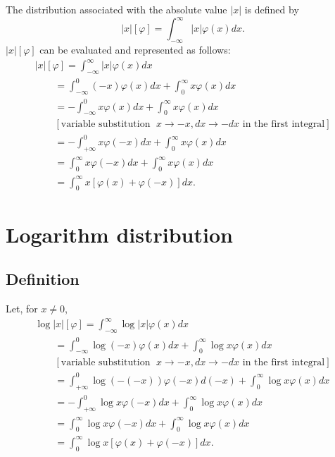 The distribution associated with the absolute value $\left|x\right|$ is defined by
 \begin{equation}
\left|x\right| \left[ \varphi \right] =
\int_{-\infty}^\infty  \left|x\right|  \varphi(x) dx.
 \end{equation}
$\left|x\right| \left[ \varphi \right]$
can be evaluated and represented as follows:
\begin{equation}
\begin{split}
\left|x\right| \left[ \varphi \right]
=
\int_{-\infty}^\infty  \left|x\right|  \varphi(x) dx
\\
\qquad
=
\int_{-\infty}^0 (-x)  \varphi(x) dx
+
\int_{0}^\infty   x   \varphi(x) dx
\\
\qquad
=
-\int_{-\infty}^0  x   \varphi(x) dx
+
\int_{0}^\infty   x   \varphi(x) dx
\\
\qquad
[\textrm{variable substitution }\; x\rightarrow -x, dx \rightarrow -dx \textrm{ in the first integral}]
\\
\qquad
=
-\int_{+\infty}^0  x   \varphi(-x) dx
+
\int_{0}^\infty   x   \varphi(x) dx
\\
\qquad
=
\int_0^{\infty}  x   \varphi(-x) dx
+
\int_{0}^\infty   x   \varphi(x) dx
\\
\qquad
=
\int_0^{\infty}  x   \left[ \varphi(x) + \varphi(-x) \right] dx .
\end{split}
\end{equation}


\section{Logarithm distribution}

\subsection{Definition}
Let, for $x\neq 0$,
\begin{equation}
\begin{split}
\log \left|x\right| \left[ \varphi \right]
=
\int_{-\infty}^\infty  \log \left|x\right|  \varphi(x) dx
\\
\qquad
=
\int_{-\infty}^0 \log (-x)   \varphi(x) dx
+
\int_{0}^\infty   \log x    \varphi(x) dx
\\
\qquad
[\textrm{variable substitution }\; x\rightarrow -x, dx \rightarrow -dx \textrm{ in the first integral}]
\\
\qquad
=
\int_{+\infty}^0  \log  (-(-x))     \varphi(-x) d(-x)
+
\int_{0}^\infty   \log x    \varphi(x) dx
\\
\qquad
=
-\int_{+\infty}^0  \log x    \varphi(-x) d x
+
\int_{0}^\infty   \log x    \varphi(x) dx
\\
\qquad
=
\int_0^{\infty}  \log x    \varphi(-x) d x
+
\int_{0}^\infty   \log x    \varphi(x) dx
\\
\qquad
=
\int_0^{\infty}  \log x  \left[  \varphi(x)
+
   \varphi(-x) \right] dx
 .
\end{split}
\label{2012-m-ch-di-logdidef}
\end{equation}

